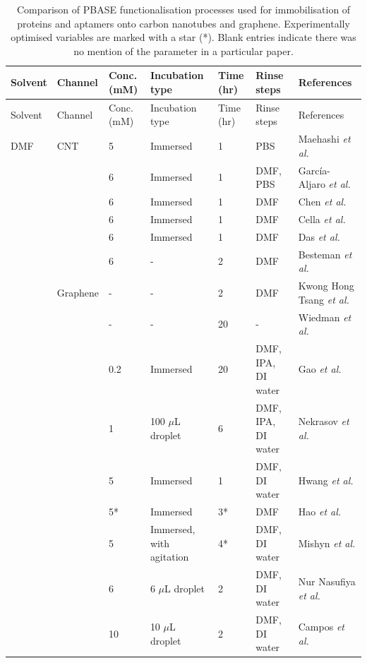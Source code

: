\documentclass[
  a4paper,
]{scrbook}
\begin{document}
\hypertarget{tbl-pbase-functionalisation}{}
\begin{longtable}[]{@{}lllllll@{}}
\caption{\label{tbl-pbase-functionalisation}Comparison of PBASE
functionalisation processes used for immobilisation of proteins and
aptamers onto carbon nanotubes and graphene. Experimentally optimised
variables are marked with a star (*). Blank entries indicate there was
no mention of the parameter in a particular paper.}\tabularnewline
\toprule()
Solvent & Channel & Conc. (mM) & Incubation type & Time (hr) & Rinse
steps & References \\
\midrule()
\endfirsthead
\toprule()
Solvent & Channel & Conc. (mM) & Incubation type & Time (hr) & Rinse
steps & References \\
\midrule()
\endhead
DMF & CNT & 5 & Immersed & 1 & PBS & Maehashi \textit{et al.}
\cite{Maehashi2007} \\
& & 6 & Immersed & 1 & DMF, PBS & García-Aljaro \textit{et al.}
\cite{Garcia-Aljaro2010} \\
& & 6 & Immersed & 1 & DMF & Chen \textit{et al.} \cite{Chen2001} \\
& & 6 & Immersed & 1 & DMF & Cella \textit{et al.} \cite{Cella2010} \\
& & 6 & Immersed & 1 & DMF & Das \textit{et al.} \cite{Das2011} \\
& & 6 & - & 2 & DMF & Besteman \textit {et al.} \cite{Besteman2003} \\
& Graphene & - & - & 2 & DMF & Kwong Hong Tsang \textit{et al.}
\cite{KwongHongTsang2019} \\
& & - & - & 20 & - & Wiedman \textit{et al.} \cite{Wiedman2017} \\
& & 0.2 & Immersed & 20 & DMF, IPA, DI water & Gao \textit{et al.}
\cite{Gao2018} \\
& & 1 & 100 \(\mu\)L droplet & 6 & DMF, IPA, DI water & Nekrasov
\textit{et al.} \cite{Nekrasov2021} \\
& & 5 & Immersed & 1 & DMF, DI water & Hwang \textit{et al.}
\cite{Hwang2016} \\
& & 5* & Immersed & 3* & DMF & Hao \textit{et al.} \cite{Hao2020} \\
& & 5 & Immersed, with agitation & 4* & DMF, DI water & Mishyn
\textit{et al.} \cite{Mishyn2022} \\
& & 6 & 6 \(\mu\)L droplet & 2 & DMF, DI water & Nur Nasufiya
\textit{et al.} \cite{NurNasyifa2020} \\
& & 10 & 10 \(\mu\)L droplet & 2 & DMF, DI water & Campos
\textit{et al.} \cite{Campos2019} \\

\end{longtable}
\end{document}

